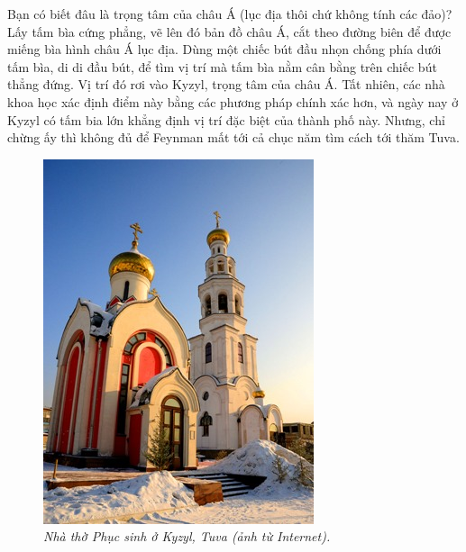 \begin{multicols}{2}
	\vskip 0.1cm
	Bạn có biết đâu là trọng tâm của châu Á (lục địa thôi chứ không tính các đảo)? Lấy tấm bìa cứng phẳng, vẽ lên đó bản đồ châu Á, cắt theo đường biên để được miếng bìa hình châu Á lục địa. Dùng một chiếc bút đầu nhọn chống phía dưới tấm bìa, di di đầu bút, để tìm vị trí mà tấm bìa nằm cân bằng trên chiếc bút thẳng đứng. Vị trí đó rơi vào Kyzyl, trọng tâm của châu Á. Tất nhiên, các nhà khoa học xác định điểm này bằng các phương pháp chính xác hơn, và ngày nay ở Kyzyl có tấm bia lớn khẳng định vị trí đặc biệt của thành phố này. Nhưng, chỉ chừng ấy thì không đủ để Feynman mất tới cả chục năm tìm cách tới thăm Tuva.
	\begin{figure}[H]
		\vspace*{-5pt}
		\centering
		\captionsetup{labelformat= empty, justification=centering}
		\includegraphics[width= 1\linewidth]{4a}
		\caption{\small\textit{\color{quantoan}Nhà thờ Phục sinh ở Kyzyl, Tuva (ảnh từ Internet).}}
		\vspace*{-10pt}

\end{figure}
\end{multicols}
